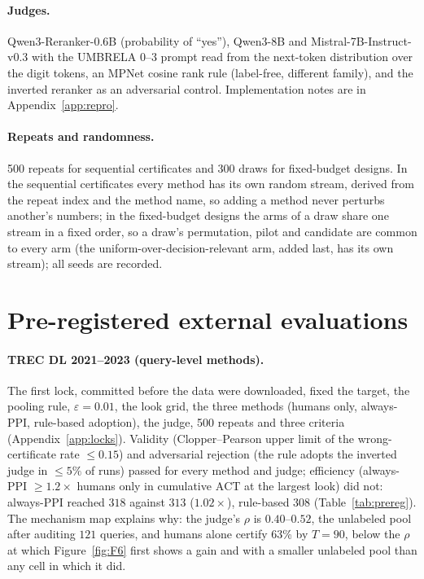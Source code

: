 \documentclass{article}
\newcommand{\eps}{\varepsilon}
\newcommand{\ACT}{\mathrm{ACT}}
\begin{document}
\paragraph{Judges.} Qwen3-Reranker-0.6B \citep{zhang2025qwen3embedding} (probability of ``yes''), Qwen3-8B \citep{yang2025qwen3} and Mistral-7B-Instruct-v0.3 \citep{jiang2023mistral} with the UMBRELA 0--3 prompt \citep{upadhyay2024umbrela} read from the next-token distribution over the digit tokens, an MPNet \citep{song2020mpnet} cosine rank rule (label-free, different family), and the inverted reranker as an adversarial control. Implementation notes are in Appendix~\ref{app:repro}.
\paragraph{Repeats and randomness.} 500 repeats for sequential certificates and 300 draws for fixed-budget designs. In the sequential certificates every method has its own random stream, derived from the repeat index and the method name, so adding a method never perturbs another's numbers; in the fixed-budget designs the arms of a draw share one stream in a fixed order, so a draw's permutation, pilot and candidate are common to every arm (the uniform-over-decision-relevant arm, added last, has its own stream); all seeds are recorded.

\section{Pre-registered external evaluations}\label{sec:prereg}
\paragraph{TREC DL 2021--2023 (query-level methods).} The first lock, committed before the data were downloaded, fixed the target, the pooling rule, $\eps=0.01$, the look grid, the three methods (humans only, always-PPI, rule-based adoption), the judge, 500 repeats and three criteria (Appendix~\ref{app:locks}). Validity (Clopper--Pearson \citep{clopper1934} upper limit of the wrong-certificate rate $\le0.15$) and adversarial rejection (the rule adopts the inverted judge in $\le5\%$ of runs) passed for every method and judge; efficiency (always-PPI $\ge1.2\times$ humans only in cumulative $\ACT$ at the largest look) did not: always-PPI reached $318$ against $313$ ($1.02\times$), rule-based $308$ (Table~\ref{tab:prereg}). The mechanism map explains why: the judge's $\rho$ is $0.40$--$0.52$, the unlabeled pool after auditing $121$ queries, and humans alone certify 63\% by $T=90$, below the $\rho$ at which Figure~\ref{fig:F6} first shows a gain and with a smaller unlabeled pool than any cell in which it did.
\end{document}
